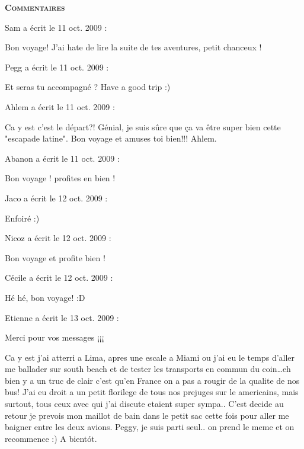 \bigskip
\textbf{\textsc{Commentaires}}

\medskip
Sam a écrit le 11 oct. 2009 :
\begin{displayquote}
Bon voyage! J'ai hate de lire la suite de tes aventures, petit chanceux !
\end{displayquote}

\medskip
Pegg a écrit le 11 oct. 2009 :
\begin{displayquote}
Et seras tu accompagné ? Have a good trip :)
\end{displayquote}

\medskip
Ahlem a écrit le 11 oct. 2009 :
\begin{displayquote}
Ca y est c'est le départ?!
Génial, je suis sûre que ça va être super bien cette "escapade latine".
Bon voyage et amuses toi bien!!!
Ahlem.
\end{displayquote}

\medskip
Abanon a écrit le 11 oct. 2009 :
\begin{displayquote}
Bon voyage ! profites en bien !
\end{displayquote}

\medskip
Jaco a écrit le 12 oct. 2009 :
\begin{displayquote}
Enfoiré :)
\end{displayquote}

\medskip
Nicoz a écrit le 12 oct. 2009 :
\begin{displayquote}
Bon voyage et profite bien !
\end{displayquote}

\medskip
Cécile a écrit le 12 oct. 2009 :
\begin{displayquote}
Hé hé, bon voyage! :D
\end{displayquote}

\medskip
Etienne a écrit le 13 oct. 2009 :
\begin{displayquote}
Merci pour vos messages ¡¡¡

Ca y est j'ai atterri a Lima, apres une escale a Miami ou j'ai eu le temps d'aller me ballader sur south beach et de tester les transports en commun du coin\dots eh bien y a un truc de clair c'est qu'en France on a pas a rougir de la qualite de nos bus! J'ai eu droit a un petit florilege de tous nos prejuges sur le americains, mais surtout, tous ceux avec qui j'ai discute etaient super sympa..
C'est decide au retour je prevois mon maillot de bain dans le petit sac cette fois pour aller me baigner entre les deux avions.
Peggy, je suis parti seul.. on prend le meme et on recommence :)
A bientót.
\end{displayquote}

